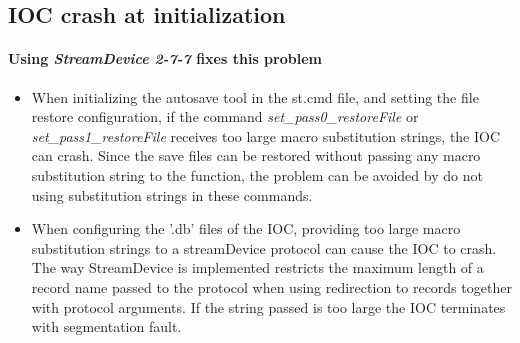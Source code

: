 \documentclass[openany]{article}
\begin{document}
	\subsection{IOC crash at initialization}

		\paragraph{\color{red} Using \emph{StreamDevice 2-7-7} fixes this problem}

		\begin{itemize}
		\item When initializing the autosave tool in the st.cmd file, and setting the file restore configuration, if the command \emph{set\_pass0\_restoreFile} or \emph{set\_pass1\_restoreFile} receives too large macro substitution strings, the IOC can crash. Since the save files can be restored without passing any macro substitution string to the function, the problem can be avoided by do not using substitution strings in these commands. 
		\end{itemize}

		\begin{itemize}
		\item When configuring the '.db' files of the IOC, providing too large macro substitution strings to a streamDevice protocol can cause the IOC to crash. The way StreamDevice is implemented restricts the maximum length of a record name passed to the protocol when using redirection to records together with protocol arguments. If the string passed is too large the IOC terminates with segmentation fault.
		\end{itemize}
\end{document}
